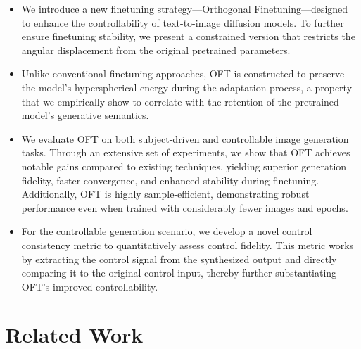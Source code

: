 \begin{itemize}[leftmargin=*,nosep]

    \item We introduce a new finetuning strategy—Orthogonal Finetuning—designed to enhance the controllability of text-to-image diffusion models. To further ensure finetuning stability, we present a constrained version that restricts the angular displacement from the original pretrained parameters.
    \item Unlike conventional finetuning approaches, OFT is constructed to preserve the model's hyperspherical energy during the adaptation process, a property that we empirically show to correlate with the retention of the pretrained model’s generative semantics.
    \item We evaluate OFT on both subject-driven and controllable image generation tasks. Through an extensive set of experiments, we show that OFT achieves notable gains compared to existing techniques, yielding superior generation fidelity, faster convergence, and enhanced stability during finetuning. Additionally, OFT is highly sample-efficient, demonstrating robust performance even when trained with considerably fewer images and epochs.
    \item For the controllable generation scenario, we develop a novel control consistency metric to quantitatively assess control fidelity. This metric works by extracting the control signal from the synthesized output and directly comparing it to the original control input, thereby further substantiating OFT’s improved controllability.
\end{itemize}

\section{Related Work}

